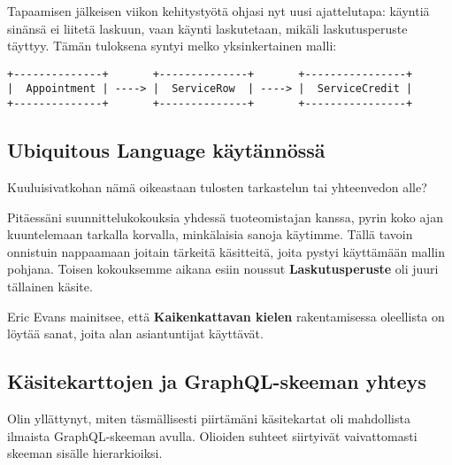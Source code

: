 Tapaamisen jälkeisen viikon kehitystyötä ohjasi nyt uusi ajattelutapa:
käyntiä sinänsä ei liitetä laskuun, vaan käynti laskutetaan, mikäli
laskutusperuste täyttyy. Tämän tuloksena syntyi melko yksinkertainen
malli:

\begin{verbatim}
+--------------+       +--------------+       +----------------+
|  Appointment | ----> |  ServiceRow  | ----> |  ServiceCredit |
+--------------+       +--------------+       +----------------+
\end{verbatim}

\hypertarget{ubiquitous-language-kuxe4ytuxe4nnuxf6ssuxe4}{%
\subsection{Ubiquitous Language
käytännössä}\label{ubiquitous-language-kuxe4ytuxe4nnuxf6ssuxe4}}

Kuuluisivatkohan nämä oikeastaan tulosten tarkastelun tai yhteenvedon
alle?

Pitäessäni suunnittelukokouksia yhdessä tuoteomistajan kanssa, pyrin
koko ajan kuuntelemaan tarkalla korvalla, minkälaisia sanoja käytimme.
Tällä tavoin onnistuin nappaamaan joitain tärkeitä käsitteitä, joita
pystyi käyttämään mallin pohjana. Toisen kokouksemme aikana esiin
noussut \textbf{Laskutusperuste} oli juuri tällainen käsite.

Eric Evans mainitsee, että \textbf{Kaikenkattavan kielen} rakentamisessa
oleellista on löytää sanat, joita alan asiantuntijat käyttävät.

\hypertarget{kuxe4sitekarttojen-ja-graphql-skeeman-yhteys}{%
\subsection{Käsitekarttojen ja GraphQL-skeeman
yhteys}\label{kuxe4sitekarttojen-ja-graphql-skeeman-yhteys}}

Olin yllättynyt, miten täsmällisesti piirtämäni käsitekartat oli
mahdollista ilmaista GraphQL-skeeman avulla. Olioiden suhteet siirtyivät
vaivattomasti skeeman sisälle hierarkioiksi.
